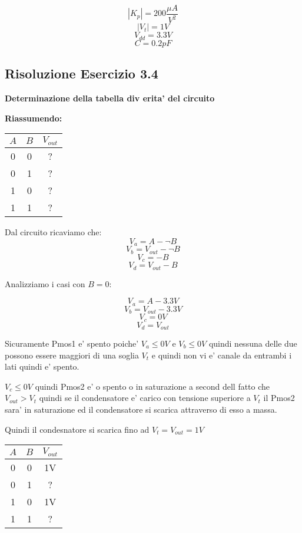 \documentclass[\main/main.tex]{subfiles}
\begin{document}
\[|K_p| = 200 \frac{ \mu A}{V^2}\]
\[|V_t| = 1V\]
\[V_{dd} = 3.3V\]
\[C = 0.2pF\]


\clearpage
\subsection{Risoluzione Esercizio 3.4}

\textbf{Determinazione della tabella div erita' del circuito}

\textbf{Riassumendo:}
\begin{center}
	\begin{tabular}{ c c | c }
		$A$ & $B$ & $V_{out}$ \\
		\hline
		0   & 0   & ?         \\
		0   & 1   & ?         \\
		1   & 0   & ?         \\
		1   & 1   & ?         \\
	\end{tabular}
\end{center}

Dal circuito ricaviamo che:
\[V_a = A - \neg B\]
\[V_b = V_{out} - \neg B\]
\[V_c =  - B\]
\[V_d = V_{out} - B\]

Analizziamo i casi con $B = 0$:

\[V_a = A - 3.3V\]
\[V_b = V_{out} -  3.3V\]
\[V_c =  0V\]
\[V_d = V_{out}\]

Sicuramente Pmos1 e' spento poiche' $V_a \leq 0V$ e $V_b \leq 0V$ quindi nessuna delle due possono essere maggiori di una soglia $V_t$ e quindi non vi e' canale da entrambi i lati quindi e' spento.

$V_c \leq 0V$  quindi Pmos2 e' o spento o in saturazione a second dell fatto che $V_{out} > V_t$ quindi se il condensatore e' carico con tensione superiore a $V_t$ il Pmos2 sara' in saturazione ed il condensatore si scarica attraverso di esso a massa.

Quindi il condesnatore si scarica fino ad $V_t = V_{out} = 1V$

\begin{center}
	\begin{tabular}{ c c | c }
		$A$ & $B$ & $V_{out}$ \\
		\hline
		0   & 0   & 1V        \\
		0   & 1   & ?         \\
		1   & 0   & 1V        \\
		1   & 1   & ?         \\
	\end{tabular}
\end{center}
\end{document}
